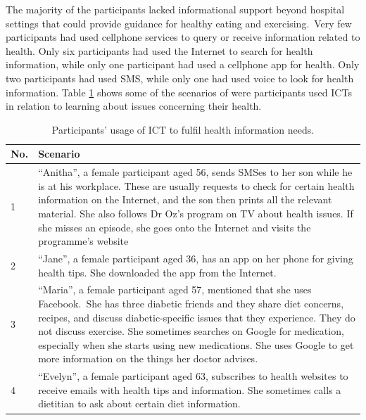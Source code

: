The majority of the participants lacked informational support beyond hospital settings that could provide guidance for healthy eating  and exercising.~Very few participants had used cellphone services to query or receive information related to health. Only six participants had used the Internet to search for health information, while only one participant had used a cellphone app for health. Only two participants had used SMS, while only one had used voice to look for health information. Table \ref{table:health_information} shows some of the scenarios of were participants used ICTs in relation to learning about issues concerning their health.
\begin{table}[h!]
\begin{center}
    \caption{Participants’ usage of ICT to fulfil health information needs.}
    \label{table:health_information}
	\begin{tabular}{|p{1cm}|p{12cm}|}
		\hline
		 \textbf{No.}&\textbf{Scenario}\\
		 \hline
		 1&``Anitha'', a female participant aged 56, sends SMSes to her son while he is at his workplace. These are usually requests to check for certain  health information on the Internet, and the son then prints all the relevant material. She also follows Dr Oz's program on TV about health issues. If she misses an episode, she goes onto the Internet and visits the programme's website\\
	  \hline
	  2& ``Jane'', a female participant aged 36, has an app on her phone for giving health tips. She downloaded the app from the Internet.\\
	  \hline
	  3& ``Maria'', a female participant aged 57, mentioned that she uses Facebook.~She has three diabetic friends and they share diet concerns, recipes, and discuss diabetic-specific issues that they experience. They do not discuss exercise. She sometimes searches on Google for medication, especially when she starts using new medications. She uses Google to get more information on the things her doctor advises.\\
	  \hline
	  4& ``Evelyn'', a female participant aged 63, subscribes to health websites to receive emails with health tips and information. She sometimes calls a dietitian to ask about certain diet information.\\
	  \hline
	\end{tabular}
  \end{center}
\end{table}

